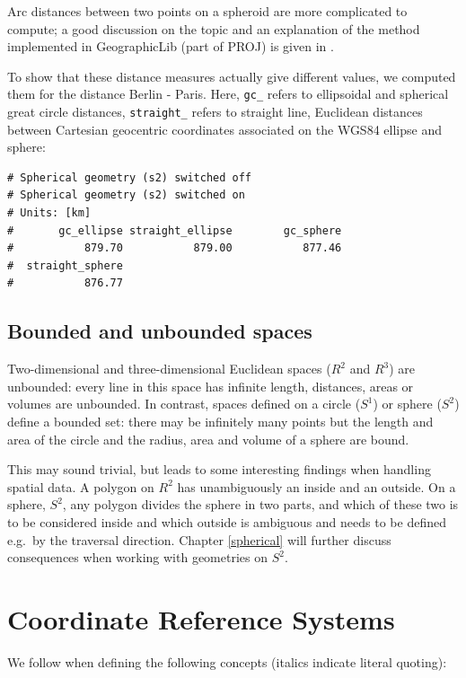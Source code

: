 \documentclass[]{book}
\begin{document}
Arc distances between two points on a spheroid are more complicated
to compute; a good discussion on the topic and an explanation of
the method implemented in GeographicLib (part of PROJ) is given
in \citet{karney2013algorithms}.

To show that these distance measures actually give different
values, we computed them for the distance Berlin - Paris. Here,
\texttt{gc\_} refers to ellipsoidal and spherical great circle distances,
\texttt{straight\_} refers to straight line, Euclidean distances between
Cartesian geocentric coordinates associated on the WGS84 ellipse
and sphere:

\begin{verbatim}
# Spherical geometry (s2) switched off
# Spherical geometry (s2) switched on
# Units: [km]
#       gc_ellipse straight_ellipse        gc_sphere 
#           879.70           879.00           877.46 
#  straight_sphere 
#           876.77
\end{verbatim}

\hypertarget{bounded}{%
\subsection{Bounded and unbounded spaces}\label{bounded}}

Two-dimensional and three-dimensional Euclidean spaces (\(R^2\) and
\(R^3\)) are unbounded: every line in this space has infinite length,
distances, areas or volumes are unbounded. In contrast, spaces
defined on a circle (\(S^1\)) or sphere (\(S^2\)) define a bounded set:
there may be infinitely many points but the length and area of the
circle and the radius, area and volume of a sphere are bound.

This may sound trivial, but leads to some interesting findings
when handling spatial data. A polygon on \(R^2\) has unambiguously an
inside and an outside. On a sphere, \(S^2\), any polygon divides
the sphere in two parts, and which of these two is to be considered
inside and which outside is ambiguous and needs to be defined
e.g.~by the traversal direction. Chapter \ref{spherical} will
further discuss consequences when working with geometries on \(S^2\).

\hypertarget{crs}{%
\section{Coordinate Reference Systems}\label{crs}}

We follow \citet{lott2015} when defining the following concepts (italics indicate literal quoting):
\end{document}
